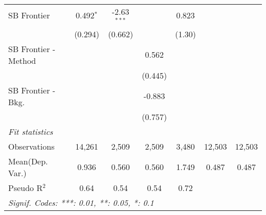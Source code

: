 \begin{tabular}{lcccccc}
   SB Frontier          & 0.492$^{*}$  & -2.63$^{***}$ &         & 0.823        &        &   \\   
                        & (0.294)      & (0.662)       &         & (1.30)       &        &   \\   
   SB Frontier - Method &              &               & 0.562   &              &        &   \\   
                        &              &               & (0.445) &              &        &   \\   
   SB Frontier - Bkg.   &              &               & -0.883  &              &        &   \\   
                        &              &               & (0.757) &              &        &   \\   
   \midrule
   \emph{Fit statistics}\\
   Observations         & 14,261       & 2,509         & 2,509   & 3,480        & 12,503 & 12,503\\  
Mean(Dep. Var.) & 0.936 & 0.560 & 0.560 & 1.749 & 0.487 & 0.487 \\
   Pseudo R$^2$         & 0.64         & 0.54          & 0.54    & 0.72         &        & \\  
   \midrule \midrule
   \multicolumn{7}{l}{\emph{Signif. Codes: ***: 0.01, **: 0.05, *: 0.1}}\\
\end{tabular}
\par\endgroup
